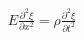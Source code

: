 \documentclass[preview]{standalone}
\begin{document}
\begin{align*}
E \frac{\partial ^2\xi}{\partial x^2} = \rho\frac{\partial ^2\xi}{\partial t^2}
\end{align*}
\end{document}

